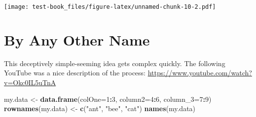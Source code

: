 \documentclass[]{book}
\newenvironment{Shaded}{\begin{snugshade}}{\end{snugshade}}
\newcommand{\CommentTok}[1]{\textcolor[rgb]{0.56,0.35,0.01}{\textit{#1}}}
\newcommand{\DataTypeTok}[1]{\textcolor[rgb]{0.13,0.29,0.53}{#1}}
\newcommand{\DecValTok}[1]{\textcolor[rgb]{0.00,0.00,0.81}{#1}}
\newcommand{\KeywordTok}[1]{\textcolor[rgb]{0.13,0.29,0.53}{\textbf{#1}}}
\newcommand{\NormalTok}[1]{#1}
\newcommand{\OperatorTok}[1]{\textcolor[rgb]{0.81,0.36,0.00}{\textbf{#1}}}
\newcommand{\StringTok}[1]{\textcolor[rgb]{0.31,0.60,0.02}{#1}}
\begin{document}
\begin{Shaded}
\end{Shaded}

\texttt{[image: test-book\_files/figure-latex/unnamed-chunk-10-2.pdf]}

\hypertarget{by-any-other-name}{%
\chapter{By Any Other Name}\label{by-any-other-name}}

This deceptively simple-seeming idea gets complex quickly. The following YouTube was a nice description of the process: \url{https://www.youtube.com/watch?v=Okc0IL5uTnA}

\begin{Shaded}
\begin{Highlighting}[]
\NormalTok{my.data <-}\StringTok{ }\KeywordTok{data.frame}\NormalTok{(}\DataTypeTok{colOne=}\DecValTok{1}\OperatorTok{:}\DecValTok{3}\NormalTok{, }\DataTypeTok{column2=}\DecValTok{4}\OperatorTok{:}\DecValTok{6}\NormalTok{, }\DataTypeTok{column_3=}\DecValTok{7}\OperatorTok{:}\DecValTok{9}\NormalTok{)}
\KeywordTok{rownames}\NormalTok{(my.data) <-}\StringTok{ }\KeywordTok{c}\NormalTok{(}\StringTok{"ant"}\NormalTok{, }\StringTok{"bee"}\NormalTok{, }\StringTok{"cat"}\NormalTok{)}
\KeywordTok{names}\NormalTok{(my.data)}
\end{Highlighting}
\end{Shaded}
\end{document}
